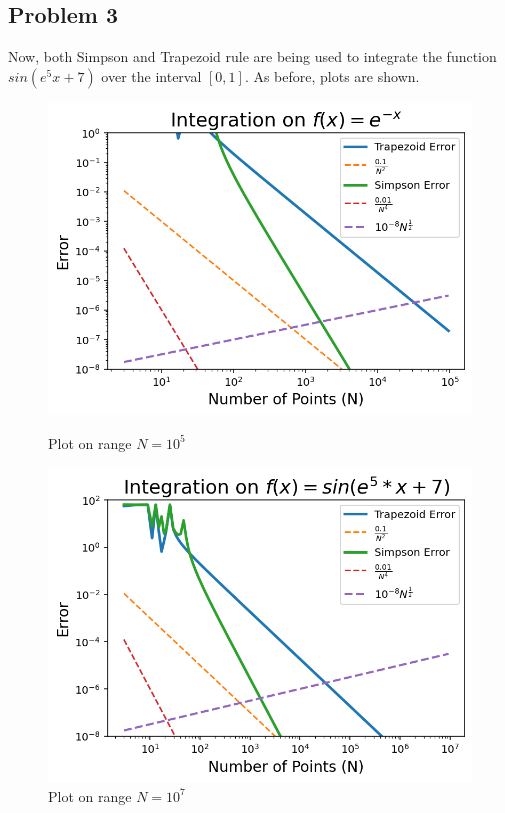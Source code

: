 \documentclass[aps,prb,groupedaddress,nofootinbib,floatfix]{revtex4}
\begin{document}
\subsection*{Problem 3} 
Now, both Simpson and Trapezoid rule are being used to integrate the function $sin(e^{5}x+7)$ over the interval $[0,1]$. As before, plots are shown.
\begin{figure}
	\begin{minipage}[c]{0.4\linewidth}
		\includegraphics[width=\linewidth]{Plot3(10^5).png}
		\caption{Plot on range $N=10^{5}$ }
		\label{fig:Plot5}
	\end{minipage}
	\begin{minipage}[c]{0.4\linewidth}
		\includegraphics[width=\linewidth]{Plot3(10^7).png}
		\caption{Plot on range $N=10^{7}$ }
		\label{fig:Plot6}
	\end{minipage}
\end{figure}
\end{document}
